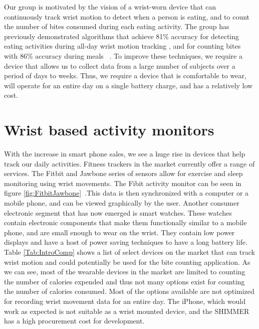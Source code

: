 Our group is motivated by the vision of a wrist-worn device that can continuously
track wrist motion to detect when a person is eating, and to count the number
of bites consumed during each eating activity.  The group has previously demonstrated
algorithms that achieve 81\% accuracy for detecting eating activities during all-day
wrist motion tracking \cite{dong2013detecting}, and for counting bites with 86\% accuracy during meals ~\cite{dong2012new}.
To improve these techniques, we require a device that allows us to collect data from
a large number of subjects over a period of days to weeks. Thus, we require a device that is
comfortable to wear, will operate for an entire day on a single battery charge, and
has a relatively low cost.
 
\section{Wrist based activity monitors}
\label{Sec:FitnessTracking}
With the increase in smart phone sales,
we see a huge rise in devices that help track our daily activities.
Fitness trackers in the market currently offer a range of services. The Fitbit \cite{Web:FitBitOfficial} and Jawbone \cite{Web:JawBoneWebsite} series of sensors allow for exercise and sleep monitoring using wrist movements. The Fibit activity monitor can be seen in figure \ref{fig:FitbitJawbone}~\cite{Web:FitbitImage}.This data is then synchronized with a computer or a mobile phone, and can be viewed graphically by the user. Another consumer electronic segment that has now emerged is smart watches. These watches contain electronic components that make them functionally similar to a mobile phone, and are small enough to wear on the wrist. They contain low power displays and have a host of power saving techniques to have a long battery life. Table \ref{Tab:IntroComp} shows a list of select devices on the market that can track wrist motion and could potentially be used for the bite counting application.
As we can see, most of the wearable devices in the market are limited to counting the number of calories expended and thus not many options exist for counting the number of calories consumed. Most of the options available are not optimized for recording wrist movement data for an entire day.
The iPhone, which would work as expected is not suitable as a wrist mounted device, and the SHIMMER has a high procurement cost for development.
